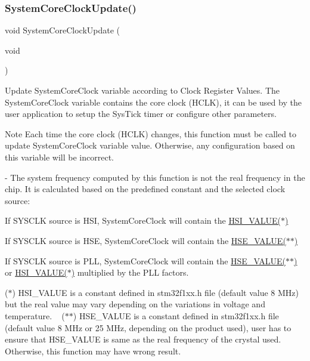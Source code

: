 \subsubsection{\texorpdfstring{System\+Core\+Clock\+Update()}{SystemCoreClockUpdate()}}
{\footnotesize\ttfamily void System\+Core\+Clock\+Update (\begin{DoxyParamCaption}\item[{void}]{ }\end{DoxyParamCaption})}



Update System\+Core\+Clock variable according to Clock Register Values. The System\+Core\+Clock variable contains the core clock (H\+C\+LK), it can be used by the user application to setup the Sys\+Tick timer or configure other parameters. 

\begin{DoxyNote}{Note}
Each time the core clock (H\+C\+LK) changes, this function must be called to update System\+Core\+Clock variable value. Otherwise, any configuration based on this variable will be incorrect. ~\newline
 

-\/ The system frequency computed by this function is not the real frequency in the chip. It is calculated based on the predefined constant and the selected clock source\+:
\end{DoxyNote}

\begin{DoxyItemize}
\item If S\+Y\+S\+C\+LK source is H\+SI, System\+Core\+Clock will contain the \mbox{\hyperlink{group__STM32F1xx__System__Private__Defines_gaaa8c76e274d0f6dd2cefb5d0b17fbc37}{H\+S\+I\+\_\+\+V\+A\+L\+U\+E($\ast$)}}
\item If S\+Y\+S\+C\+LK source is H\+SE, System\+Core\+Clock will contain the \mbox{\hyperlink{group__STM32F1xx__System__Private__Defines_gaeafcff4f57440c60e64812dddd13e7cb}{H\+S\+E\+\_\+\+V\+A\+L\+U\+E($\ast$$\ast$)}}
\item If S\+Y\+S\+C\+LK source is P\+LL, System\+Core\+Clock will contain the \mbox{\hyperlink{group__STM32F1xx__System__Private__Defines_gaeafcff4f57440c60e64812dddd13e7cb}{H\+S\+E\+\_\+\+V\+A\+L\+U\+E($\ast$$\ast$)}} or \mbox{\hyperlink{group__STM32F1xx__System__Private__Defines_gaaa8c76e274d0f6dd2cefb5d0b17fbc37}{H\+S\+I\+\_\+\+V\+A\+L\+U\+E($\ast$)}} multiplied by the P\+LL factors.
\end{DoxyItemize}

($\ast$) H\+S\+I\+\_\+\+V\+A\+L\+UE is a constant defined in stm32f1xx.\+h file (default value 8 M\+Hz) but the real value may vary depending on the variations in voltage and temperature. ~\newline
 ($\ast$$\ast$) H\+S\+E\+\_\+\+V\+A\+L\+UE is a constant defined in stm32f1xx.\+h file (default value 8 M\+Hz or 25 M\+Hz, depending on the product used), user has to ensure that H\+S\+E\+\_\+\+V\+A\+L\+UE is same as the real frequency of the crystal used. Otherwise, this function may have wrong result.


